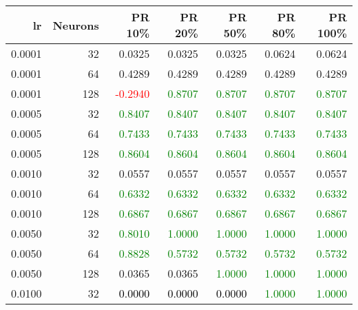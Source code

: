 \begin{tabular}{rrrrrrr}
\toprule
lr & Neurons & PR 10\% & PR 20\% & PR 50\% & PR 80\% & PR 100\% \\
\midrule
0.0001 & 32 & \textcolor{blu} {0.0325} & \textcolor{blu} {0.0325} & \textcolor{blu} {0.0325} & \textcolor{blu} {0.0624} & \textcolor{blu} {0.0624} \\
0.0001 & 64 & \textcolor{blu} {0.4289} & \textcolor{blu} {0.4289} & \textcolor{blu} {0.4289} & \textcolor{blu} {0.4289} & \textcolor{blu} {0.4289} \\
0.0001 & 128 & \textcolor{red} {-0.2940} & \textcolor{green} {0.8707} & \textcolor{green} {0.8707} & \textcolor{green} {0.8707} & \textcolor{green} {0.8707} \\
0.0005 & 32 & \textcolor{green} {0.8407} & \textcolor{green} {0.8407} & \textcolor{green} {0.8407} & \textcolor{green} {0.8407} & \textcolor{green} {0.8407} \\
0.0005 & 64 & \textcolor{green} {0.7433} & \textcolor{green} {0.7433} & \textcolor{green} {0.7433} & \textcolor{green} {0.7433} & \textcolor{green} {0.7433} \\
0.0005 & 128 & \textcolor{green} {0.8604} & \textcolor{green} {0.8604} & \textcolor{green} {0.8604} & \textcolor{green} {0.8604} & \textcolor{green} {0.8604} \\
0.0010 & 32 & \textcolor{blu} {0.0557} & \textcolor{blu} {0.0557} & \textcolor{blu} {0.0557} & \textcolor{blu} {0.0557} & \textcolor{blu} {0.0557} \\
0.0010 & 64 & \textcolor{green} {0.6332} & \textcolor{green} {0.6332} & \textcolor{green} {0.6332} & \textcolor{green} {0.6332} & \textcolor{green} {0.6332} \\
0.0010 & 128 & \textcolor{green} {0.6867} & \textcolor{green} {0.6867} & \textcolor{green} {0.6867} & \textcolor{green} {0.6867} & \textcolor{green} {0.6867} \\
0.0050 & 32 & \textcolor{green} {0.8010} & \textcolor{green} {1.0000} & \textcolor{green} {1.0000} & \textcolor{green} {1.0000} & \textcolor{green} {1.0000} \\
0.0050 & 64 & \textcolor{green} {0.8828} & \textcolor{green} {0.5732} & \textcolor{green} {0.5732} & \textcolor{green} {0.5732} & \textcolor{green} {0.5732} \\
0.0050 & 128 & \textcolor{blu} {0.0365} & \textcolor{blu} {0.0365} & \textcolor{green} {1.0000} & \textcolor{green} {1.0000} & \textcolor{green} {1.0000} \\
0.0100 & 32 & \textcolor{black} {0.0000} & \textcolor{black} {0.0000} & \textcolor{black} {0.0000} & \textcolor{green} {1.0000} & \textcolor{green} {1.0000} \\

\end{tabular}
